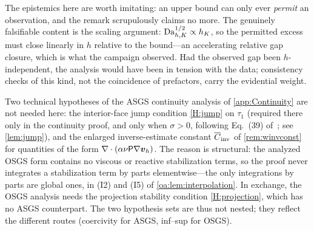 \begin{pedagogy}
The epistemics here are worth imitating: an upper bound can only ever
\emph{permit} an observation, and the remark scrupulously claims no more. The
genuinely falsifiable content is the scaling argument: $\mathrm{Da}_{h,K}^{1/2} \propto
h_K$, so the permitted excess must close linearly in $h$ relative to the
bound---an accelerating relative gap closure, which is what the campaign
observed. Had the observed gap been $h$-independent, the analysis would have
been in tension with the data; consistency checks of this kind, not the
coincidence of prefactors, carry the evidential weight.
\end{pedagogy}

\begin{remark}
\label{oa:rem:dispensed}
Two technical hypotheses of the ASGS continuity analysis of \cref{app:Continuity} are not
needed here: the interior-face jump condition \cref{H:jump} on $\tau_1$ (required there only in
the continuity proof, and only when $\sigma > 0$, following Eq.~(39)
of~\cite{codina2001stabilized}; see \cref{lem:jump}), and the enlarged inverse-estimate constant
$\overline{C}_{\mathrm{inv}}$ of \cref{rem:winvconst} for quantities of the form
$\nabla\cdot(\alpha\nu\mathsf{P}\nabla\boldsymbol{v}_h)$. The reason is structural: the analyzed
OSGS form contains no viscous or reactive stabilization terms, so the proof never
integrates a stabilization term by parts elementwise---the only integrations by parts
are global ones, in (I2) and (I5) of \cref{oa:lem:interpolation}. In exchange, the OSGS
analysis needs the projection stability condition \cref{H:projection}, which has no ASGS
counterpart. The two hypothesis sets are thus not nested; they reflect the different
routes (coercivity for ASGS, inf--sup for OSGS).
\end{remark}

